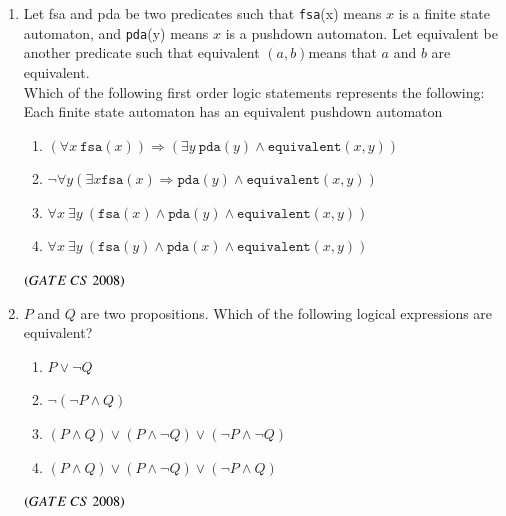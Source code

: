\documentclass[journal]{IEEEtran}
\numberwithin{equation}{enumi}
\numberwithin{figure}{enumi}
\begin{document}
\begin{enumerate}
\item Let fsa and pda be two predicates such that \texttt{fsa}(x) means 
$x$ is a finite state automaton, and \texttt{pda}(y) means $x$ is a pushdown automaton.  
Let equivalent be another predicate such that equivalent $(a,b)$means that $a$ and $b$ are equivalent.\\  
Which of the following first order logic statements represents the following:\\

Each finite state automaton has an equivalent pushdown automaton

\begin{enumerate}
\item $(\forall x \ \texttt{fsa}(x)) \Rightarrow (\exists y \ \texttt{pda}(y) \land \texttt{equivalent}(x,y))$
\item  $ \neg \forall y  (\exists x  \texttt{fsa}(x) \Rightarrow \texttt{pda}(y) \land \texttt{equivalent}(x,y))$
\item $\forall x \ \exists y \ (\texttt{fsa}(x) \land   \texttt{pda}(y) \land \texttt{equivalent}(x,y))$
\item $\forall x \ \exists y \ (\texttt{fsa}(y) \land \texttt{pda}(x) \land \texttt{equivalent}(x,y))$
\end{enumerate}
\hfill $\left(GATE\ CS\  2008\right)$
 

\item $P$ and $Q$ are two propositions. Which of the following logical expressions are
equivalent? 
\begin{enumerate}   
   \item \quad $P \lor \neg Q  $  
   \item \quad $\lnot (\neg P \land Q) $  
   \item \quad $(P \land Q) \lor ( P \land \lnot Q) \lor (\neg P \land \neg Q)$  
   \item \quad $(P \land Q) \lor ( P \land \lnot Q) \lor (\neg P \land  Q)$  
\end{enumerate}
\begin{enumerate}
\end{enumerate}
\hfill $\left(GATE\ CS\  2008\right)$


\end{enumerate}
\end{document}
